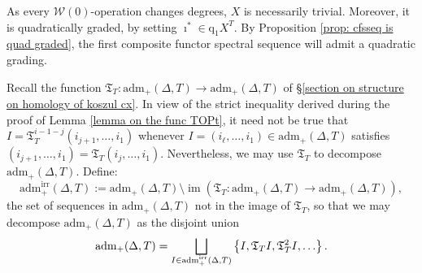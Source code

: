 \documentclass[11pt]{amsart} \renewcommand{\baselinestretch}{1.4}
\theoremstyle{plain}
\theoremstyle{definition}
\DeclareMathOperator{\im}{im}
\renewcommand{\to}{\longrightarrow}
\newcommand{\calw}{\mathcal{W}}
\newcommand{\quadgrad}[1]{\mathrm{q}_{#1}}
\newcommand{\aDT}{\mathrm{adm}_+(\Delta,T)}
\newcommand{\aDTirr}{\mathrm{adm}_+^\mathrm{irr}(\Delta,T)}
\newcommand{\TOP}{\mathfrak{T}}
\begin{document}
\begin{Calculations of HWn for n nonzero}
As every $\calw(0)$-operation changes degrees, $X$ is necessarily trivial. Moreover, it is quadratically graded, by setting $\imath^*\in \quadgrad{1}X^T$. By Proposition \ref{prop: cfsseq is quad graded}, the first composite functor spectral sequence will admit a quadratic grading.


Recall the function $\TOP_T:\aDT\to \aDT$ of \S\ref{section on structure on homology of koszul cx}. In view of the strict inequality derived during the proof of Lemma \ref{lemma on the func TOPt}, it need not be true that $I=\TOP_T^{i-1-j}(i_{j+1},\ldots,i_1)$ whenever  $I=(i_\ell,\ldots,i_1)\in \aDT$ satisfies $(i_{j+1},\ldots,i_1)=\TOP_T(i_{j},\ldots,i_1)$. Nevertheless, we may use $\TOP_T$ to decompose $\aDT$.
Define:
\[\aDTirr:= \aDT\setminus\im(\TOP_T:\aDT\to\aDT),\]
the set of sequences in $\aDT$ not in the image of $\TOP_T$, so that we may decompose $\aDT$ as the disjoint union
\[\aDT=\bigsqcup_{\smash{I\in \aDTirr}}\left\{I,\TOP_T I,\TOP_T^2I,\ldots\right\}.\]








\end{Calculations of HWn for n nonzero}
\end{document}
